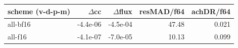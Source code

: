 \begin{tabular}{lrrrr}
\toprule
scheme (v-d-p-m) & $\Delta$cc & $\Delta$flux & resMAD/f64 & achDR/f64 \\
\midrule
all-bf16 & -4.4e-06 & -4.5e-04 & 47.48 & 0.021 \\
all-f16 & -4.1e-07 & -7.0e-05 & 10.13 & 0.099 \\
\bottomrule
\end{tabular}